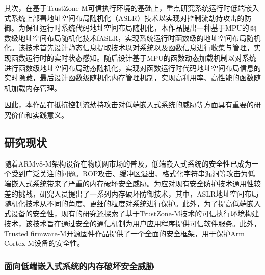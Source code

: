 \documentclass[UTF8,12pt,a4paper]{ctexart}
\numberwithin{figure}{section}
\begin{document}
\par 其次，在基于TrustZone-M可信执行环境的基础上，重点研究系统运行时低端嵌入式系统上部署地址空间布局随机化（ASLR）技术以实现对控制流劫持攻击的防御。为保证运行时系统代码地址空间布局随机化，本作品提出一种基于MPU的函数级地址空间布局随机化技术fASLR，实现系统运行时函数级的地址空间布局随机化。该技术首先设计静态信息提取技术以对系统以及函数信息进行收集与管理，实现函数运行时的实时状态感知。随后设计基于MPU的函数动态加载机制以对系统进行函数级地址空间布局动态随机化，实现对函数运行时代码地址空间布局信息的实时隐藏，最后设计函数级随机化内存管理机制，实现高利用率、高性能的函数随机加载内存管理。

\par 因此，本作品在抵抗控制流劫持攻击对低端嵌入式系统的威胁等方面具有重要的研究价值和实践意义。


\subsection{研究现状}
\par 随着ARMv8-M架构设备在物联网市场的普及，低端嵌入式系统的安全性已成为一个受到广泛关注的问题。ROP攻击、缓冲区溢出、格式化字符串漏洞等攻击为低端嵌入式系统带来了严重的内存破坏安全威胁。为应对现有安全防护技术通用性较差的挑战，研究人员提出了一系列内存破坏防御技术，其中，ASLR地址空间布局随机化技术从不同的角度、更细的粒度对系统进行保护。此外，为了提高低端嵌入式设备的安全性，现有的研究还探索了基于TrustZone-M技术的可信执行环境构建技术，该技术旨在通过安全的通信机制为用户应用程序提供可信软件服务。此外，Trusted firmware-M开源固件作品提供了一个全面的安全框架，用于保护Arm Cortex-M设备的安全性。

\subsubsection{面向低端嵌入式系统的内存破坏安全威胁}
\end{document}
